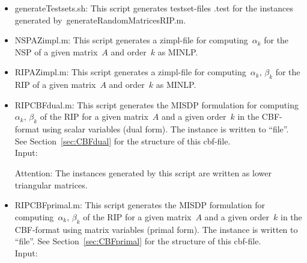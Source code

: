 \documentclass[11pt,a4paper]{article}
\newenvironment{dense_itemize}{%
  \begin{list}{$\circ$}%
    {\setlength{\topsep}{1mm}%
      \setlength{\partopsep}{0mm}%
      \setlength{\parskip}{0mm}%
      \setlength{\parsep}{0mm}%
      \setlength{\itemsep}{0mm}%
      \setlength{\labelwidth}{4mm}%
      \setlength{\leftmargin}{0mm}%
      \addtolength{\leftmargin}{\labelwidth}%
      \addtolength{\leftmargin}{\labelsep}%
      \setlength{\itemindent}{0mm}}}%
  {\end{list}}
\theoremstyle{definition}
\begin{document}
\begin{itemize}
\begin{dense_itemize}
  \end{dense_itemize}
\item \textsf{generateTestsets.sh}: This script generates testset-files
  \textsf{\*.test} for the instances generated
  by~\textsf{generateRandomMatricesRIP.m}.
\item \textsf{NSPAZimpl.m}: This script generates a zimpl-file for
  computing~$\alpha_k$ for the NSP of a given matrix~$A$ and order~$k$ as
  MINLP.
\item \textsf{RIPAZimpl.m}: This script generates a zimpl-file for
  computing~$\alpha_k,\, \beta_k$ for the RIP of a given matrix~$A$ and
  order~$k$ as MINLP.
\item \textsf{RIPCBFdual.m}: This script generates the MISDP formulation
  for computing~$\alpha_k,\, \beta_k$ of the RIP for a given matrix~$A$ and
  a given order~$k$ in the CBF-format using scalar variables (dual
  form). The instance is written to ``file''. See Section~\ref{sec:CBFdual}
  for the structure of
  this cbf-file. \\
  Input:
  Attention: The instances generated by this script are written as lower
  triangular matrices.
\item \textsf{RIPCBFprimal.m}: This script generates the MISDP formulation
  for computing~$\alpha_k,\, \beta_k$ of the RIP for a given matrix~$A$ and
  a given order~$k$ in the CBF-format using matrix variables (primal
  form). The instance is written to ``file''. See
  Section~\ref{sec:CBFprimal} for the structure of
  this cbf-file. \\
  Input:
\end{itemize}
\end{document}
